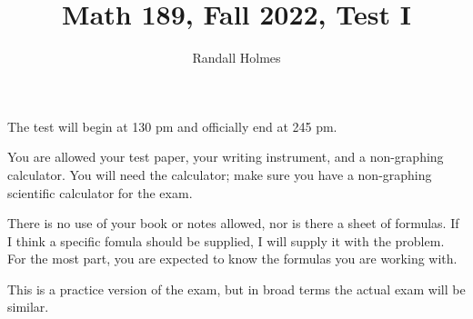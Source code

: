 \documentclass[12pt]{article}
\title{Math 189, Fall 2022, Test I}
\author{Randall Holmes}
\begin{document}
\maketitle

The test will begin at 130 pm and officially end at 245 pm.

You are allowed your test paper, your writing instrument, and a non-graphing calculator.  You will need the calculator;
make sure you have a non-graphing scientific calculator for the exam.

There is no use of your book or notes allowed, nor is there a sheet of formulas.  If I think a specific fomula should be supplied, I will supply it with the problem.  For the most part, you are expected to know the formulas you are working with.


This is a practice version of the exam, but in broad terms the actual exam will be similar.
\newpage
\end{document}
